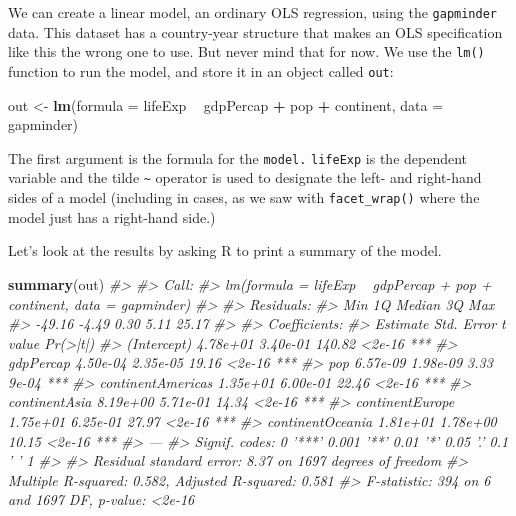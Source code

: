 \documentclass[]{book}
\newenvironment{Shaded}{\begin{snugshade}}{\end{snugshade}}
\newcommand{\CommentTok}[1]{\textcolor[rgb]{0.56,0.35,0.01}{\textit{#1}}}
\newcommand{\DataTypeTok}[1]{\textcolor[rgb]{0.13,0.29,0.53}{#1}}
\newcommand{\KeywordTok}[1]{\textcolor[rgb]{0.13,0.29,0.53}{\textbf{#1}}}
\newcommand{\NormalTok}[1]{#1}
\newcommand{\OperatorTok}[1]{\textcolor[rgb]{0.81,0.36,0.00}{\textbf{#1}}}
\newcommand{\StringTok}[1]{\textcolor[rgb]{0.31,0.60,0.02}{#1}}
\begin{document}
We can create a linear model, an ordinary OLS regression, using the \texttt{gapminder} data. This dataset has a country-year structure that makes an OLS specification like this the wrong one to use. But never mind that for now. We use the \texttt{lm()} function to run the model, and store it in an object called \texttt{out}:

\begin{Shaded}
\begin{Highlighting}[]
\NormalTok{out <-}\StringTok{ }\KeywordTok{lm}\NormalTok{(}\DataTypeTok{formula =}\NormalTok{ lifeExp }\OperatorTok{~}\StringTok{ }\NormalTok{gdpPercap }\OperatorTok{+}\StringTok{ }\NormalTok{pop }\OperatorTok{+}\StringTok{ }\NormalTok{continent,}
          \DataTypeTok{data =}\NormalTok{ gapminder)}
\end{Highlighting}
\end{Shaded}

The first argument is the formula for the \texttt{model.} \texttt{lifeExp} is the dependent variable and the tilde \texttt{\textasciitilde{}} operator is used to designate the left- and right-hand sides of a model (including in cases, as we saw with \texttt{facet\_wrap()} where the model just has a right-hand side.)

Let's look at the results by asking R to print a summary of the model.\\

\begin{Shaded}
\begin{Highlighting}[]
\KeywordTok{summary}\NormalTok{(out)}
\CommentTok{#> }
\CommentTok{#> Call:}
\CommentTok{#> lm(formula = lifeExp ~ gdpPercap + pop + continent, data = gapminder)}
\CommentTok{#> }
\CommentTok{#> Residuals:}
\CommentTok{#>    Min     1Q Median     3Q    Max }
\CommentTok{#> -49.16  -4.49   0.30   5.11  25.17 }
\CommentTok{#> }
\CommentTok{#> Coefficients:}
\CommentTok{#>                   Estimate Std. Error t value Pr(>|t|)    }
\CommentTok{#> (Intercept)       4.78e+01   3.40e-01  140.82   <2e-16 ***}
\CommentTok{#> gdpPercap         4.50e-04   2.35e-05   19.16   <2e-16 ***}
\CommentTok{#> pop               6.57e-09   1.98e-09    3.33    9e-04 ***}
\CommentTok{#> continentAmericas 1.35e+01   6.00e-01   22.46   <2e-16 ***}
\CommentTok{#> continentAsia     8.19e+00   5.71e-01   14.34   <2e-16 ***}
\CommentTok{#> continentEurope   1.75e+01   6.25e-01   27.97   <2e-16 ***}
\CommentTok{#> continentOceania  1.81e+01   1.78e+00   10.15   <2e-16 ***}
\CommentTok{#> ---}
\CommentTok{#> Signif. codes:  0 '***' 0.001 '**' 0.01 '*' 0.05 '.' 0.1 ' ' 1}
\CommentTok{#> }
\CommentTok{#> Residual standard error: 8.37 on 1697 degrees of freedom}
\CommentTok{#> Multiple R-squared:  0.582,  Adjusted R-squared:  0.581 }
\CommentTok{#> F-statistic:  394 on 6 and 1697 DF,  p-value: <2e-16}
\end{Highlighting}
\end{Shaded}
\end{document}
